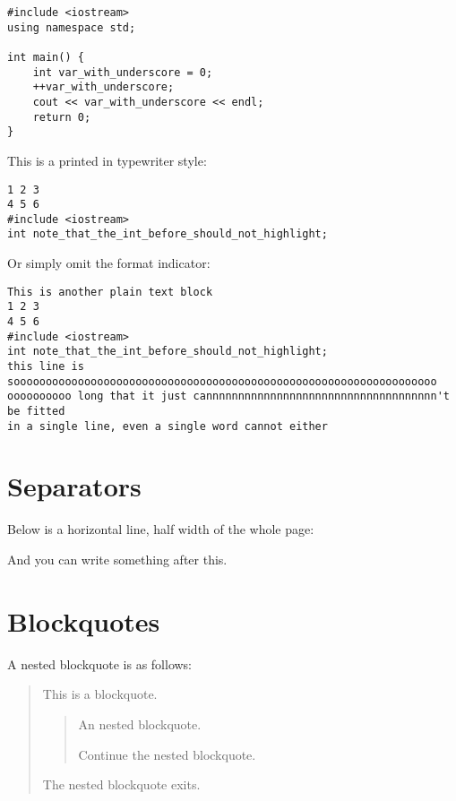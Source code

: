\begin{verbatim}
#include <iostream>
using namespace std;

int main() {
    int var_with_underscore = 0;
	++var_with_underscore;
	cout << var_with_underscore << endl;
	return 0;
}
\end{verbatim}

\par This is a  printed in typewriter style:

\begin{verbatim}
1 2 3
4 5 6
#include <iostream>
int note_that_the_int_before_should_not_highlight;
\end{verbatim}

\par Or simply omit the  format indicator:

\begin{verbatim}
This is another plain text block
1 2 3
4 5 6
#include <iostream>
int note_that_the_int_before_should_not_highlight;
this line is soooooooooooooooooooooooooooooooooooooooooooooooooooooooooooooooooo
oooooooooo long that it just cannnnnnnnnnnnnnnnnnnnnnnnnnnnnnnnnnnn't be fitted 
in a single line, even a single word cannot either
\end{verbatim}

\chapter*{Separators}
\par Below is a horizontal line, half width of the whole page:
\begin{center}\makebox[0.5\textwidth]{\hrulefill}\end{center}
\par And you can write something after this.
\chapter*{Blockquotes}
\par A nested blockquote is as follows:
\begin{shaded}\begin{quotation}
\par This is a blockquote.\begin{shaded}\begin{quotation}
\par An nested blockquote.\par Continue the nested blockquote.\end{quotation}\end{shaded}\par The nested blockquote exits.\end{quotation}\end{shaded}
